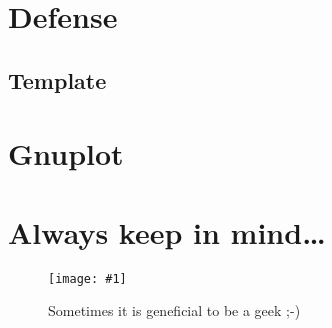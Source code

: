 \documentclass{article}
\newcommand{\img}[4]{
	\begin{figure}[!htb]
		\centering
		\texttt{[image: \#1]}
		\caption{#3}
		\label{#2}
	\end{figure}
}
\begin{document}
\section{Defense}

\subsection{Template}

\subsection{}





\section{Gnuplot}





\section{Always keep in mind\dots}

\img{repetetive-tasks.png}{fig:geeks}{Sometimes it is geneficial to be a geek ;-)}{0.6}
\end{document}
